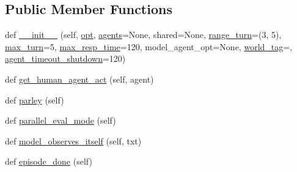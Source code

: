 \subsection*{Public Member Functions}
\begin{DoxyCompactItemize}
\item 
def \hyperlink{classprojects_1_1wizard__of__wikipedia_1_1mturk__evaluation__task_1_1worlds_1_1WizardEval_aca423a5d725be8a770f2f9c880f84122}{\+\_\+\+\_\+init\+\_\+\+\_\+} (self, \hyperlink{classparlai_1_1core_1_1worlds_1_1World_a3640d92718acd3e6942a28c1ab3678bd}{opt}, \hyperlink{classparlai_1_1core_1_1worlds_1_1MultiAgentDialogWorld_a05fc93525cb86edef121980fc55f9926}{agents}=None, shared=None, \hyperlink{classprojects_1_1wizard__of__wikipedia_1_1mturk__evaluation__task_1_1worlds_1_1WizardEval_aa245724e16215bb2739524d94cee6582}{range\+\_\+turn}=(3, 5), \hyperlink{classprojects_1_1wizard__of__wikipedia_1_1mturk__evaluation__task_1_1worlds_1_1WizardEval_a56e2813e954250d045d519297a9469e3}{max\+\_\+turn}=5, \hyperlink{classprojects_1_1wizard__of__wikipedia_1_1mturk__evaluation__task_1_1worlds_1_1WizardEval_acf3ad9fdd1d432a9a520ea8bce150f4f}{max\+\_\+resp\+\_\+time}=120, model\+\_\+agent\+\_\+opt=None, \hyperlink{classprojects_1_1wizard__of__wikipedia_1_1mturk__evaluation__task_1_1worlds_1_1WizardEval_a704cab2652de8aba49350f041d249804}{world\+\_\+tag}=\textquotesingle{}\textquotesingle{}, \hyperlink{classprojects_1_1wizard__of__wikipedia_1_1mturk__evaluation__task_1_1worlds_1_1WizardEval_aef19629b948f594f5db8b97a0a482c00}{agent\+\_\+timeout\+\_\+shutdown}=120)
\item 
def \hyperlink{classprojects_1_1wizard__of__wikipedia_1_1mturk__evaluation__task_1_1worlds_1_1WizardEval_abc7bd5ac461df6eaf0e591888aaf68b9}{get\+\_\+human\+\_\+agent\+\_\+act} (self, agent)
\item 
def \hyperlink{classprojects_1_1wizard__of__wikipedia_1_1mturk__evaluation__task_1_1worlds_1_1WizardEval_abfff1c20503e898e721969580c160f67}{parley} (self)
\item 
def \hyperlink{classprojects_1_1wizard__of__wikipedia_1_1mturk__evaluation__task_1_1worlds_1_1WizardEval_a1cffb86be3a550ac33519b487959ec8c}{parallel\+\_\+eval\+\_\+mode} (self)
\item 
def \hyperlink{classprojects_1_1wizard__of__wikipedia_1_1mturk__evaluation__task_1_1worlds_1_1WizardEval_a57f678d93fee85fb988fce00c22560d5}{model\+\_\+observes\+\_\+itself} (self, txt)
\item 
def \hyperlink{classprojects_1_1wizard__of__wikipedia_1_1mturk__evaluation__task_1_1worlds_1_1WizardEval_a858503006ae3bd8583cecb008a0eb522}{episode\+\_\+done} (self)

\end{DoxyCompactItemize}
